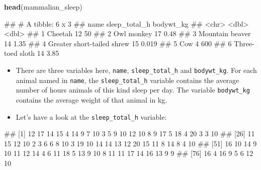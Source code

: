 \documentclass[
]{book}
\newenvironment{Shaded}{\begin{snugshade}}{\end{snugshade}}
\newcommand{\FunctionTok}[1]{\textcolor[rgb]{0.13,0.29,0.53}{\textbf{#1}}}
\newcommand{\NormalTok}[1]{#1}
\newcommand{\SpecialCharTok}[1]{\textcolor[rgb]{0.81,0.36,0.00}{\textbf{#1}}}
\begin{document}
\begin{Shaded}
\begin{Highlighting}[]
\FunctionTok{head}\NormalTok{(mammalian\_sleep)}
\end{Highlighting}
\end{Shaded}

\begin{Shaded}
\begin{Highlighting}[]
\NormalTok{\#\# \# A tibble: 6 x 3}
\NormalTok{\#\#   name                       sleep\_total\_h bodywt\_kg}
\NormalTok{\#\#   \textless{}chr\textgreater{}                              \textless{}dbl\textgreater{}     \textless{}dbl\textgreater{}}
\NormalTok{\#\# 1 Cheetah                               12    50    }
\NormalTok{\#\# 2 Owl monkey                            17     0.48 }
\NormalTok{\#\# 3 Mountain beaver                       14     1.35 }
\NormalTok{\#\# 4 Greater short{-}tailed shrew            15     0.019}
\NormalTok{\#\# 5 Cow                                    4   600    }
\NormalTok{\#\# 6 Three{-}toed sloth                      14     3.85}
\end{Highlighting}
\end{Shaded}

\begin{itemize}
\item
  There are three variables here, \texttt{name}, \texttt{sleep\_total\_h} and \texttt{bodywt\_kg}. For each animal named in \texttt{name}, the \texttt{sleep\_total\_h} variable contains the average number of hours animals of this kind sleep per day. The variable \texttt{bodywt\_kg} contains the average weight of that animal in kg.
\item
  Let's have a look at the \texttt{sleep\_total\_h} variable:
\end{itemize}

\begin{Shaded}
\end{Shaded}

\begin{Shaded}
\begin{Highlighting}[]
\NormalTok{\#\#  [1] 12 17 14 15  4 14  9  7 10  3  5  9 10 12 10  8  9 17  5 18  4 20  3  3 10}
\NormalTok{\#\# [26] 11 15 12 10  2  3  6  6  8 10  3 19 10 14 14 13 12 20 15 11  8 14  8  4 10}
\NormalTok{\#\# [51] 16 10 14  9 10 11 12 14  4  6 11 18  5 13  9 10  8 11 11 17 14 16 13  9  9}
\NormalTok{\#\# [76] 16  4 16  9  5  6 12 10}
\end{Highlighting}
\end{Shaded}
\end{document}
